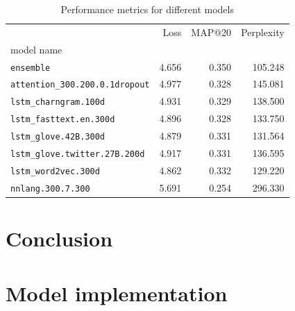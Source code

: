\documentclass[12pt]{article}
\begin{document}
\begin{table}[h]
\centering
\begin{tabular}{lrrr}
\toprule
{}                                     & Loss  & MAP@20 & Perplexity \\
model name                             &       &        & \\
\midrule
\texttt{ensemble}                      & 4.656 & 0.350  & 105.248 \\
\texttt{attention\_300.200.0.1dropout} & 4.977 & 0.328  & 145.081 \\
\texttt{lstm\_charngram.100d}          & 4.931 & 0.329  & 138.500 \\
\texttt{lstm\_fasttext.en.300d}        & 4.896 & 0.328  & 133.750 \\
\texttt{lstm\_glove.42B.300d}          & 4.879 & 0.331  & 131.564 \\
\texttt{lstm\_glove.twitter.27B.200d}  & 4.917 & 0.331  & 136.595 \\
\texttt{lstm\_word2vec.300d}           & 4.862 & 0.332  & 129.220 \\
\texttt{nnlang.300.7.300}              & 5.691 & 0.254  & 296.330 \\
\bottomrule
\end{tabular}
\caption{Performance metrics for different models}
\label{table:performance}
\end{table}

\section{Conclusion}





\appendix
\section{Model implementation}






\end{document}
